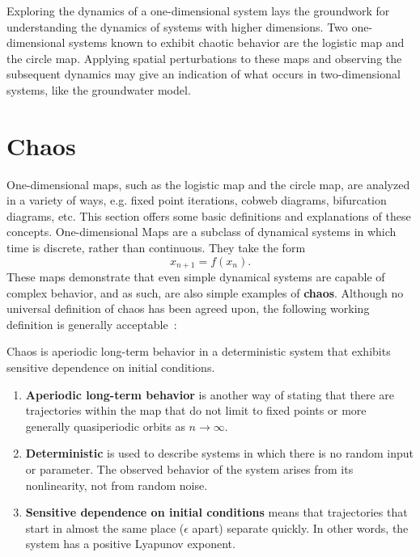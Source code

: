 Exploring the dynamics of a one-dimensional system lays the groundwork
for understanding the dynamics of systems with higher dimensions. Two
one-dimensional systems known to exhibit chaotic behavior are the
logistic map and the circle map. Applying spatial perturbations to
these maps and observing the subsequent dynamics may give an
indication of what occurs in two-dimensional systems, like the
groundwater model. 

\section{Chaos}
One-dimensional maps, such as the logistic map and the circle map, are
analyzed in a variety of ways, e.g. fixed point iterations,
cobweb diagrams, bifurcation diagrams, etc. This section offers some
basic definitions and explanations of these concepts. One-dimensional Maps are a
subclass of dynamical systems in which time is discrete, rather than
continuous. They take the form
\begin{equation*}
x_{n+1}=f(x_n).
\end{equation*}
These maps demonstrate that even simple dynamical systems are capable
of complex behavior, and as such, are also simple examples of
\textbf{chaos}. Although no universal definition of chaos has been
agreed upon, the following working definition is generally acceptable~\cite{strogatz}:
\begin{singlespace}
\begin{definition}
Chaos is aperiodic long-term behavior in a deterministic
  system that exhibits sensitive dependence on initial conditions.
\end{definition}
\end{singlespace}
\begin{enumerate}
\item \textbf{Aperiodic long-term behavior} is another way of stating
  that there are trajectories within the map that do not limit to
  fixed points or more generally quasiperiodic orbits as $n \to \infty$.
\item \textbf{Deterministic} is used to describe systems in which
  there is no random input or parameter. The observed behavior of the
  system arises from its nonlinearity, not from random noise.
\item \textbf{Sensitive dependence on initial conditions} means that
  trajectories that start in almost the same place ($\epsilon$ apart)
  separate quickly. In other words, the system has a
  positive Lyapunov exponent.
\end{enumerate}

